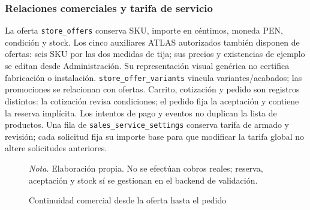 \documentclass[12pt,letterpaper]{article}
\newcommand{\nota}[1]{\par{\normalfont\normalsize\doublespacing\raggedright\setlength{\parindent}{0pt}\noindent\textit{Nota.} #1\par}}
\newcommand{\ruta}[1]{{\urlstyle{tt}\nolinkurl{#1}}}
\begin{document}
\subsubsection{Relaciones comerciales y tarifa de servicio}
La oferta \ruta{store_offers} conserva SKU, importe en céntimos, moneda PEN, condición y stock. Los cinco auxiliares ATLAS autorizados también disponen de ofertas: seis SKU por las dos medidas de tija; sus precios y existencias de ejemplo se editan desde Administración. Su representación visual genérica no certifica fabricación o instalación. \ruta{store_offer_variants} vincula variantes/acabados; las promociones se relacionan con ofertas. Carrito, cotización y pedido son registros distintos: la cotización revisa condiciones; el pedido fija la aceptación y contiene la reserva implícita. Los intentos de pago y eventos no duplican la lista de productos. Una fila de \ruta{sales_service_settings} conserva tarifa de armado y revisión; cada solicitud fija su importe base para que modificar la tarifa global no altere solicitudes anteriores.

\begin{figure}[H]\caption{Continuidad comercial desde la oferta hasta el pedido}\label{fig:comercio}
\centering
{}
\nota{Elaboración propia. No se efectúan cobros reales; reserva, aceptación y stock sí se gestionan en el backend de validación.}
\end{figure}
\end{document}
